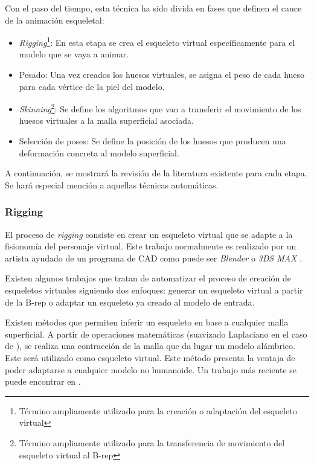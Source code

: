 Con el paso del tiempo, esta técnica ha sido divida en fases que definen el cauce de la animación esqueletal:

\begin{itemize}
    \item \emph{Rigging}\footnote{Término ampliamente utilizado para la creación o adaptación del esqueleto virtual}: En esta etapa se crea el esqueleto virtual específicamente para el modelo que se vaya a animar.
    \item Pesado: Una vez creados los huesos virtuales, se asigna el peso %
    de cada hueso para cada vértice de la piel del modelo.
    \item \emph{Skinning}\footnote{Término ampliamente utilizado para la transferencia de movimiento del esqueleto virtual al \acs{B-rep}}: Se define los algoritmos que van a transferir el movimiento de los huesos virtuales a la malla superficial asociada. 
    \item Selección de poses: Se define la posición de los huesos que producen una deformación concreta al modelo superficial.
\end{itemize}

A continuación, se mostrará la revisión de la literatura existente para cada etapa. Se hará especial mención a aquellas técnicas automáticas.


\subsubsection{Rigging}
\label{art:rigging}

El proceso de \emph{rigging} consiste en crear un esqueleto virtual que se adapte a la fisionomía del personaje virtual. Este trabajo normalmente es realizado por un artista ayudado de un programa de \ac{CAD} como puede ser \emph{Blender} \cite{blender} o \emph{3DS MAX} \cite{3ds}. 

Existen algunos trabajos que tratan de automatizar el proceso de creación de esqueletos virtuales siguiendo dos enfoques: generar un esqueleto virtual a partir de la \ac{B-rep} o adaptar un esqueleto ya creado al modelo de entrada.

Existen métodos que permiten inferir un esqueleto en base a cualquier malla superficial. A partir de operaciones matemáticas (suavizado Laplaciano en el caso de \cite{laplacian}), se realiza una contracción de la malla que da lugar un modelo alámbrico. Este será utilizado como esqueleto virtual. Este método presenta la ventaja de poder adaptarse a cualquier modelo no humanoide. Un trabajo más reciente se puede encontrar en \cite{Tagliasacchi}.

